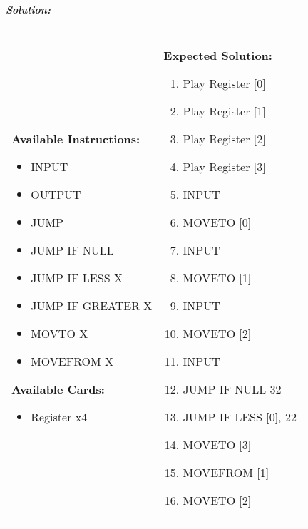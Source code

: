 \subparagraph{Solution:} 
\begin{center}
    \begin{tabular}{ | m{5cm} | m{9cm} | } 
        \hline
            \textbf{Available Instructions:} 
            \begin{itemize}
                \setlength\itemsep{-.35em}
                \item INPUT
                \item OUTPUT
                \item JUMP
                \item JUMP IF NULL
                \item JUMP IF LESS X
                \item JUMP IF GREATER X
                \item MOVTO X
                \item MOVEFROM X
            \end{itemize}
            \textbf{Available Cards:} 
            \begin{itemize}
                \setlength\itemsep{-.35em}
                \item Register x4
            \end{itemize}& 
            \textbf{Expected Solution:} 
            \begin{enumerate}
                \setlength\itemsep{-.60em}
                \item Play Register [0]
                \item Play Register [1]
                \item Play Register [2]
                \item Play Register [3]
                \item INPUT
                \item MOVETO [0]
                \item INPUT
                \item MOVETO [1]
                \item INPUT
                \item MOVETO [2]
                \item INPUT
                \item JUMP IF NULL 32
                \item JUMP IF LESS [0], 22
                \item MOVETO [3]
                \item MOVEFROM [1]
                \item MOVETO [2]

\end{enumerate}
\end{tabular}
\end{center}
